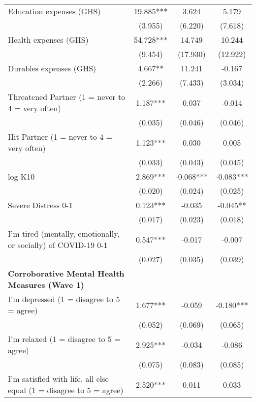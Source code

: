 \begin{ThreePartTable}
\begin{table}[tbp]
\begin{tabular}{lccc}
 Education expenses (GHS) & 19.885*** & 3.624 & 5.179 \\ [0.1em] 
                   &      (3.955)     &      (6.220)     &      (7.618)     \\ [0.1em] 
 Health expenses (GHS) & 54.728*** & 14.749 & 10.244 \\ [0.1em] 
                   &      (9.454)     &      (17.930)     &      (12.922)     \\ [0.1em] 
 Durables expenses (GHS) & 4.667** & 11.241 & -0.167 \\ [0.1em] 
                   &      (2.266)     &      (7.433)     &      (3.034)     \\ [0.1em] 
 Threatened Partner (1 = never to 4 = very often) & 1.187*** & 0.037 & -0.014 \\ [0.1em] 
                   &      (0.035)     &      (0.046)     &      (0.046)     \\ [0.1em] 
 Hit Partner (1 = never to 4 = very often) & 1.123*** & 0.030 & 0.005 \\ [0.1em] 
                   &      (0.033)     &      (0.043)     &      (0.045)     \\ [0.1em] 
 log K10 & 2.869*** & -0.068*** & -0.083*** \\ [0.1em] 
                   &      (0.020)     &      (0.024)     &      (0.025)     \\ [0.1em] 
 Severe Distress 0-1 & 0.123*** & -0.035 & -0.045** \\ [0.1em] 
                   &      (0.017)     &      (0.023)     &      (0.018)     \\ [0.1em] 
 I'm tired (mentally, emotionally, or socially) of COVID-19 0-1 & 0.547*** & -0.017 & -0.007 \\ [0.1em] 
                   &      (0.027)     &      (0.035)     &      (0.039)     \\ [0.1em] 
\textbf{Corroborative Mental Health Measures (Wave 1)} & & & \\ 
 I'm depressed (1 = disagree to 5 = agree) & 1.677*** & -0.059 & -0.180*** \\ [0.1em] 
                   &      (0.052)     &      (0.069)     &      (0.065)     \\ [0.1em] 
 I'm relaxed (1 = disagree to 5 = agree) & 2.925*** & -0.034 & -0.086 \\ [0.1em] 
                   &      (0.075)     &      (0.083)     &      (0.085)     \\ [0.1em] 
 I'm satisfied with life, all else equal (1 = disagree to 5 = agree) & 2.520*** & 0.011 & 0.033 \\ [0.1em] 

\end{tabular}
\end{table}
\end{ThreePartTable}

